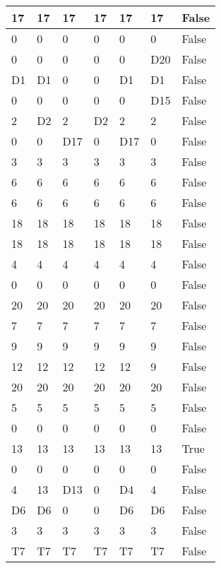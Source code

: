 \begin{longtable}[htbp]{| p{} | p{} | p{}| p{}| p{}| p{}| p{}|}
17 & 17 & 17 & 17 & 17 & 17 & False \\ \hline
0 & 0 & 0 & 0 & 0 & 0 & False \\ \hline
0 & 0 & 0 & 0 & 0 & \multicolumn{1}{l|}{D20} & False \\ \hline
\multicolumn{1}{|l|}{D1} & \multicolumn{1}{l|}{D1} & 0 & 0 & \multicolumn{1}{l|}{D1} & \multicolumn{1}{l|}{D1} & False \\ \hline
0 & 0 & 0 & 0 & 0 & \multicolumn{1}{l|}{D15} & False \\ \hline
2 & \multicolumn{1}{l|}{D2} & 2 & \multicolumn{1}{l|}{D2} & 2 & 2 & False \\ \hline
0 & 0 & \multicolumn{1}{l|}{D17} & 0 & \multicolumn{1}{l|}{D17} & 0 & False \\ \hline
3 & 3 & 3 & 3 & 3 & 3 & False \\ \hline
6 & 6 & 6 & 6 & 6 & 6 & False \\ \hline
6 & 6 & 6 & 6 & 6 & 6 & False \\ \hline
18 & 18 & 18 & 18 & 18 & 18 & False \\ \hline
18 & 18 & 18 & 18 & 18 & 18 & False \\ \hline
4 & 4 & 4 & 4 & 4 & 4 & False \\ \hline
0 & 0 & 0 & 0 & 0 & 0 & False \\ \hline
20 & 20 & 20 & 20 & 20 & 20 & False \\ \hline
7 & 7 & 7 & 7 & 7 & 7 & False \\ \hline
9 & 9 & 9 & 9 & 9 & 9 & False \\ \hline
12 & 12 & 12 & 12 & 12 & 9 & False \\ \hline
20 & 20 & 20 & 20 & 20 & 20 & False \\ \hline
5 & 5 & 5 & 5 & 5 & 5 & False \\ \hline
0 & 0 & 0 & 0 & 0 & 0 & False \\ \hline
13 & 13 & 13 & 13 & 13 & 13 & True \\ \hline
0 & 0 & 0 & 0 & 0 & 0 & False \\ \hline
4 & 13 & \multicolumn{1}{l|}{D13} & 0 & \multicolumn{1}{l|}{D4} & 4 & False \\ \hline
\multicolumn{1}{|l|}{D6} & \multicolumn{1}{l|}{D6} & 0 & 0 & \multicolumn{1}{l|}{D6} & \multicolumn{1}{l|}{D6} & False \\ \hline
3 & 3 & 3 & 3 & 3 & 3 & False \\ \hline
\multicolumn{1}{|l|}{T7} & \multicolumn{1}{l|}{T7} & \multicolumn{1}{l|}{T7} & \multicolumn{1}{l|}{T7} & \multicolumn{1}{l|}{T7} & \multicolumn{1}{l|}{T7} & False \\ \hline

\end{longtable}
